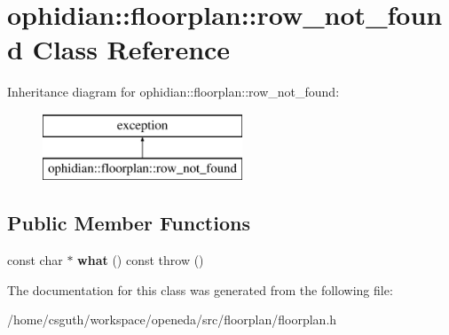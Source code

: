 \hypertarget{classophidian_1_1floorplan_1_1row__not__found}{\section{ophidian\-:\-:floorplan\-:\-:row\-\_\-not\-\_\-found Class Reference}
\label{classophidian_1_1floorplan_1_1row__not__found}
}
Inheritance diagram for ophidian\-:\-:floorplan\-:\-:row\-\_\-not\-\_\-found\-:\begin{figure}[H]
\begin{center}
\leavevmode
\includegraphics[height=2.000000cm]{classophidian_1_1floorplan_1_1row__not__found}
\end{center}
\end{figure}
\subsection*{Public Member Functions}
\begin{DoxyCompactItemize}
\item 
\hypertarget{classophidian_1_1floorplan_1_1row__not__found_aba5e109d33fbb2466e771abb803bea74}{const char $\ast$ {\bfseries what} () const   throw ()}\label{classophidian_1_1floorplan_1_1row__not__found_aba5e109d33fbb2466e771abb803bea74}

\end{DoxyCompactItemize}


The documentation for this class was generated from the following file\-:\begin{DoxyCompactItemize}
\item 
/home/csguth/workspace/openeda/src/floorplan/floorplan.\-h\end{DoxyCompactItemize}
